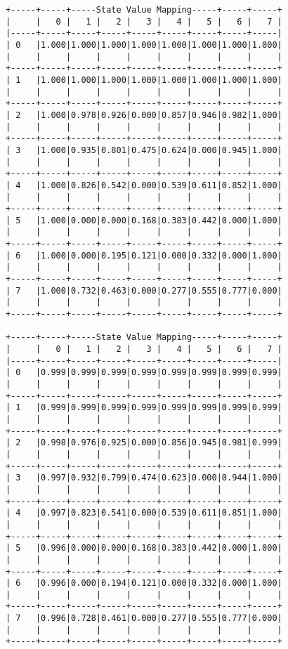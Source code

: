 \documentclass[11pt]{article}
\begin{document}
    \begin{Verbatim}[commandchars=\\\{\}]
+-----+-----+-----State Value Mapping-----+-----+-----+
|     |   0 |   1 |   2 |   3 |   4 |   5 |   6 |   7 |
|-----+-----+-----+-----+-----+-----+-----+-----+-----|
| 0   |1.000|1.000|1.000|1.000|1.000|1.000|1.000|1.000|
|     |     |     |     |     |     |     |     |     |
+-----+-----+-----+-----+-----+-----+-----+-----+-----+
| 1   |1.000|1.000|1.000|1.000|1.000|1.000|1.000|1.000|
|     |     |     |     |     |     |     |     |     |
+-----+-----+-----+-----+-----+-----+-----+-----+-----+
| 2   |1.000|0.978|0.926|0.000|0.857|0.946|0.982|1.000|
|     |     |     |     |     |     |     |     |     |
+-----+-----+-----+-----+-----+-----+-----+-----+-----+
| 3   |1.000|0.935|0.801|0.475|0.624|0.000|0.945|1.000|
|     |     |     |     |     |     |     |     |     |
+-----+-----+-----+-----+-----+-----+-----+-----+-----+
| 4   |1.000|0.826|0.542|0.000|0.539|0.611|0.852|1.000|
|     |     |     |     |     |     |     |     |     |
+-----+-----+-----+-----+-----+-----+-----+-----+-----+
| 5   |1.000|0.000|0.000|0.168|0.383|0.442|0.000|1.000|
|     |     |     |     |     |     |     |     |     |
+-----+-----+-----+-----+-----+-----+-----+-----+-----+
| 6   |1.000|0.000|0.195|0.121|0.000|0.332|0.000|1.000|
|     |     |     |     |     |     |     |     |     |
+-----+-----+-----+-----+-----+-----+-----+-----+-----+
| 7   |1.000|0.732|0.463|0.000|0.277|0.555|0.777|0.000|
|     |     |     |     |     |     |     |     |     |
+-----+-----+-----+-----+-----+-----+-----+-----+-----+

+-----+-----+-----State Value Mapping-----+-----+-----+
|     |   0 |   1 |   2 |   3 |   4 |   5 |   6 |   7 |
|-----+-----+-----+-----+-----+-----+-----+-----+-----|
| 0   |0.999|0.999|0.999|0.999|0.999|0.999|0.999|0.999|
|     |     |     |     |     |     |     |     |     |
+-----+-----+-----+-----+-----+-----+-----+-----+-----+
| 1   |0.999|0.999|0.999|0.999|0.999|0.999|0.999|0.999|
|     |     |     |     |     |     |     |     |     |
+-----+-----+-----+-----+-----+-----+-----+-----+-----+
| 2   |0.998|0.976|0.925|0.000|0.856|0.945|0.981|0.999|
|     |     |     |     |     |     |     |     |     |
+-----+-----+-----+-----+-----+-----+-----+-----+-----+
| 3   |0.997|0.932|0.799|0.474|0.623|0.000|0.944|1.000|
|     |     |     |     |     |     |     |     |     |
+-----+-----+-----+-----+-----+-----+-----+-----+-----+
| 4   |0.997|0.823|0.541|0.000|0.539|0.611|0.851|1.000|
|     |     |     |     |     |     |     |     |     |
+-----+-----+-----+-----+-----+-----+-----+-----+-----+
| 5   |0.996|0.000|0.000|0.168|0.383|0.442|0.000|1.000|
|     |     |     |     |     |     |     |     |     |
+-----+-----+-----+-----+-----+-----+-----+-----+-----+
| 6   |0.996|0.000|0.194|0.121|0.000|0.332|0.000|1.000|
|     |     |     |     |     |     |     |     |     |
+-----+-----+-----+-----+-----+-----+-----+-----+-----+
| 7   |0.996|0.728|0.461|0.000|0.277|0.555|0.777|0.000|
|     |     |     |     |     |     |     |     |     |
+-----+-----+-----+-----+-----+-----+-----+-----+-----+


    \end{Verbatim}
\end{document}
